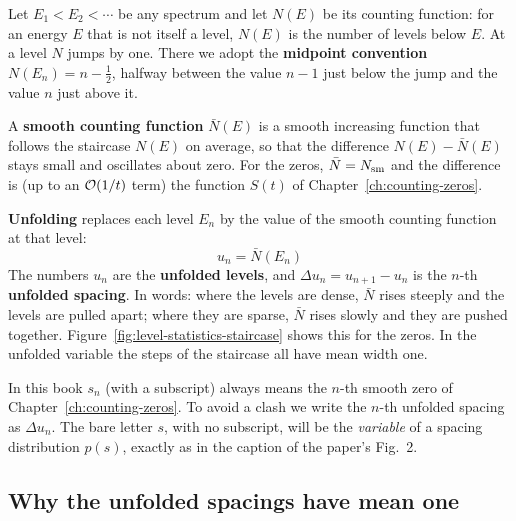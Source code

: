 Let $E_1<E_2<\cdots$ be any spectrum and let $N(E)$ be its counting function: for an energy $E$ that is not itself a level, $N(E)$ is the number of levels below $E$. At a level $N$ jumps by one. There we adopt the \textbf{midpoint convention} $N(E_n)=n-\tfrac12$, halfway between the value $n-1$ just below the jump and the value $n$ just above it.

A \textbf{smooth counting function} $\bar N(E)$ is a smooth increasing function that follows the staircase $N(E)$ on average, so that the difference $N(E)-\bar N(E)$ stays small and oscillates about zero. For the zeros, $\bar N=N_{\mathrm{sm}}$ and the difference is (up to an $\mathcal{O}(1/t)$ term) the function $S(t)$ of Chapter~\ref{ch:counting-zeros}.

\textbf{Unfolding} replaces each level $E_n$ by the value of the smooth counting function at that level:
\begin{equation}
\boxed{\;u_n=\bar N(E_n)\;}
\label{eq:level-statistics-unfold}
\end{equation}
The numbers $u_n$ are the \textbf{unfolded levels}, and $\Delta u_n=u_{n+1}-u_n$ is the $n$-th \textbf{unfolded spacing}. In words: where the levels are dense, $\bar N$ rises steeply and the levels are pulled apart; where they are sparse, $\bar N$ rises slowly and they are pushed together. Figure~\ref{fig:level-statistics-staircase} shows this for the zeros. In the unfolded variable the steps of the staircase all have mean width one.

\begin{pitfall}
In this book $s_n$ (with a subscript) always means the $n$-th smooth zero of Chapter~\ref{ch:counting-zeros}. To avoid a clash we write the $n$-th unfolded spacing as $\Delta u_n$. The bare letter $s$, with no subscript, will be the \emph{variable} of a spacing distribution $p(s)$, exactly as in the caption of the paper's Fig.~2.
\end{pitfall}

\subsection{Why the unfolded spacings have mean one}

